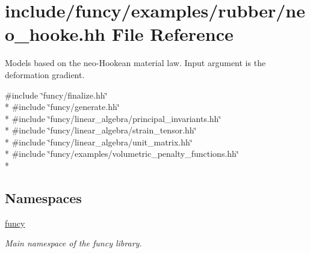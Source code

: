 \hypertarget{neo__hooke_8hh}{\section{include/funcy/examples/rubber/neo\-\_\-hooke.hh File Reference}
\label{neo__hooke_8hh}
}


Models based on the neo-\/\-Hookean material law. Input argument is the deformation gradient.  


{\ttfamily \#include \char`\"{}funcy/finalize.\-hh\char`\"{}}\\*
{\ttfamily \#include \char`\"{}funcy/generate.\-hh\char`\"{}}\\*
{\ttfamily \#include \char`\"{}funcy/linear\-\_\-algebra/principal\-\_\-invariants.\-hh\char`\"{}}\\*
{\ttfamily \#include \char`\"{}funcy/linear\-\_\-algebra/strain\-\_\-tensor.\-hh\char`\"{}}\\*
{\ttfamily \#include \char`\"{}funcy/linear\-\_\-algebra/unit\-\_\-matrix.\-hh\char`\"{}}\\*
{\ttfamily \#include \char`\"{}funcy/examples/volumetric\-\_\-penalty\-\_\-functions.\-hh\char`\"{}}\\*
\subsection*{Namespaces}
\begin{DoxyCompactItemize}
\item 
\hyperlink{namespacefuncy}{funcy}
\begin{DoxyCompactList}\small\item\em Main namespace of the funcy library. \end{DoxyCompactList}\end{DoxyCompactItemize}
